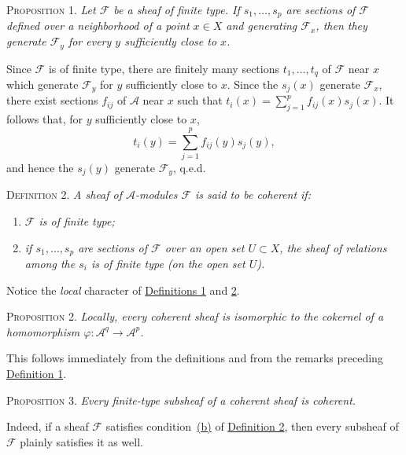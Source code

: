 \label{fac:I:2:no:12:prop:1}
\textsc{Proposition 1.} \textit{Let $\mathcal{F}$ be a sheaf of finite type. If $s_1,\ldots,s_p$ are sections of $\mathcal{F}$ defined over a neighborhood of a point $x\in X$ and generating $\mathcal{F}_x$, then they generate $\mathcal{F}_y$ for every $y$ sufficiently close to $x$.}

Since $\mathcal{F}$ is of finite type, there are finitely many sections $t_1,\ldots,t_q$ of $\mathcal{F}$ near $x$ which generate $\mathcal{F}_y$ for $y$ sufficiently close to $x$. Since the $s_j(x)$ generate $\mathcal{F}_x$, there exist sections $f_{ij}$ of $\mathcal{A}$ near $x$ such that $t_i(x)=\sum_{j=1}^{p}f_{ij}(x)s_j(x)$. It follows that, for $y$ sufficiently close to $x$,
\[
t_i(y)=\sum_{j=1}^{p}f_{ij}(y)s_j(y),
\]
and hence the $s_j(y)$ generate $\mathcal{F}_y$, q.e.d.

\label{fac:I:2:no:12:def:2}
\textsc{Definition 2.} \textit{A sheaf of $\mathcal{A}$-modules $\mathcal{F}$ is said to be coherent if:}

\begin{enumerate}[label=(\alph*),leftmargin=2.2em]
\item\label{fac:I:2:no:12:def:2:item:a} \textit{$\mathcal{F}$ is of finite type;} 
\item\label{fac:I:2:no:12:def:2:item:b} \textit{if $s_1,\ldots,s_p$ are sections of $\mathcal{F}$ over an open set $U\subset X$, the sheaf of relations among the $s_i$ is of finite type (on the open set $U$).}
\end{enumerate}

Notice the \textit{local} character of \hyperref[fac:I:2:no:12:def:1]{Definitions 1} and \hyperref[fac:I:2:no:12:def:2]{2}.

\label{fac:I:2:no:12:prop:2}
\textsc{Proposition 2.} \textit{Locally, every coherent sheaf is isomorphic to the cokernel of a homomorphism $\varphi:\mathcal{A}^q\to\mathcal{A}^p$.}

This follows immediately from the definitions and from the remarks preceding \hyperref[fac:I:2:no:12:def:1]{Definition 1}.

\label{fac:I:2:no:12:prop:3}
\textsc{Proposition 3.} \textit{Every finite-type subsheaf of a coherent sheaf is coherent.}

Indeed, if a sheaf $\mathcal{F}$ satisfies condition~\hyperref[fac:I:2:no:12:def:2:item:b]{(b)} of \hyperref[fac:I:2:no:12:def:2]{Definition 2}, then every subsheaf of $\mathcal{F}$ plainly satisfies it as well.
